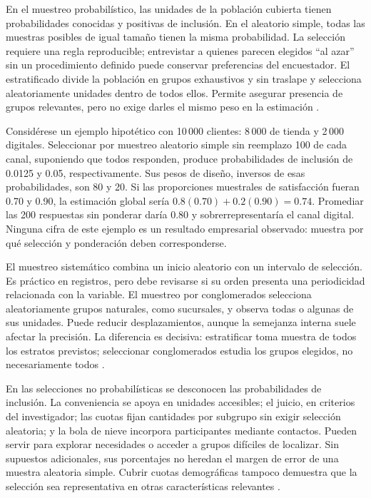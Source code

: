 {En el muestreo probabilístico, las unidades de la población cubierta tienen probabilidades conocidas y positivas de inclusión. En el aleatorio simple, todas las muestras posibles de igual tamaño tienen la misma probabilidad. La selección requiere una regla reproducible; entrevistar a quienes parecen elegidos ``al azar'' sin un procedimiento definido puede conservar preferencias del encuestador. El estratificado divide la población en grupos exhaustivos y sin traslape y selecciona aleatoriamente unidades dentro de todos ellos. Permite asegurar presencia de grupos relevantes, pero no exige darles el mismo peso en la estimación \citep[sec.~1.2]{holmesBusiness2023}.

Considérese un ejemplo hipotético con 10\,000 clientes: 8\,000 de tienda y 2\,000 digitales. Seleccionar por muestreo aleatorio simple sin reemplazo 100 de cada canal, suponiendo que todos responden, produce probabilidades de inclusión de 0.0125 y 0.05, respectivamente. Sus pesos de diseño, inversos de esas probabilidades, son 80 y 20. Si las proporciones muestrales de satisfacción fueran 0.70 y 0.90, la estimación global sería $0.8(0.70)+0.2(0.90)=0.74$. Promediar las 200 respuestas sin ponderar daría 0.80 y sobrerrepresentaría el canal digital. Ninguna cifra de este ejemplo es un resultado empresarial observado: muestra por qué selección y ponderación deben corresponderse.

El muestreo sistemático combina un inicio aleatorio con un intervalo de selección. Es práctico en registros, pero debe revisarse si su orden presenta una periodicidad relacionada con la variable. El muestreo por conglomerados selecciona aleatoriamente grupos naturales, como sucursales, y observa todas o algunas de sus unidades. Puede reducir desplazamientos, aunque la semejanza interna suele afectar la precisión. La diferencia es decisiva: estratificar toma muestra de todos los estratos previstos; seleccionar conglomerados estudia los grupos elegidos, no necesariamente todos \citep{holmesBusiness2023}.

En las selecciones no probabilísticas se desconocen las probabilidades de inclusión. La conveniencia se apoya en unidades accesibles; el juicio, en criterios del investigador; las cuotas fijan cantidades por subgrupo sin exigir selección aleatoria; y la bola de nieve incorpora participantes mediante contactos. Pueden servir para explorar necesidades o acceder a grupos difíciles de localizar. Sin supuestos adicionales, sus porcentajes no heredan el margen de error de una muestra aleatoria simple. Cubrir cuotas demográficas tampoco demuestra que la selección sea representativa en otras características relevantes \citep{statcanNoProb2021}.

}
